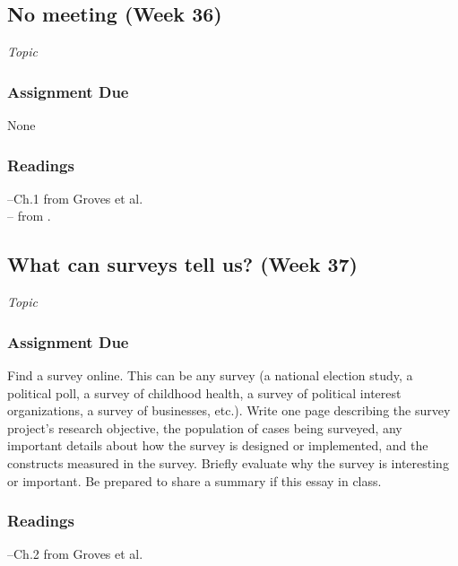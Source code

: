 \documentclass[12pt,a4paper]{article}
\newcommand{\reading}[2][]{\noindent --{#1} from \bibentry{#2}.\vspace{.25em}\\}
\newcommand{\textbook}[2][]{\noindent --{#1} from Groves et al.\vspace{.25em}\\} %
\newcommand{\seealso}{\noindent \emph{See Also:}\\}
\begin{document}
\subsection{No meeting (Week 36)}
\emph{Topic}
\vspace{1em}

\subsubsection*{Assignment Due}
None

\subsubsection*{Readings}
\textbook[Ch.1]{}
\reading{Brady2000} %




\clearpage
\subsection{What can surveys tell us? (Week 37)}
\emph{Topic}


\vspace{1em}
\subsubsection*{Assignment Due}
Find a survey online. This can be any survey (a national election study, a political poll, a survey of childhood health, a survey of political interest organizations, a survey of businesses, etc.). Write one page describing the survey project's research objective, the population of cases being surveyed, any important details about how the survey is designed or implemented, and the constructs measured in the survey. Briefly evaluate why the survey is interesting or important. Be prepared to share a summary if this essay in class.

\subsubsection*{Readings}
\textbook[Ch.2]{} %
\end{document}
